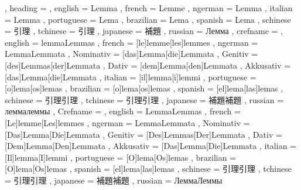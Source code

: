   {
    , heading   = {
                    , english     = Lemma
                    , french      = Lemme
                    , ngerman     = Lemma
                    , italian     = Lemma
                    , portuguese  = Lema
                    , brazilian   = Lema
                    , spanish     = Lema
                    , schinese    = 引理
                    , tchinese    = 引理
                    , japanese    = 補題
                    , russian     = Лемма
                  }
    , crefname  = {
                    , english     = {lemma}{Lemmas}
                    , french      = [le]{lemme}[les]{lemmes}
                    , ngerman     = { {Lemma}{Lemmata}
                                      , Nominativ = [das]{Lemma}[die]{Lemmata}
                                      , Genitiv   = [des]{Lemmas}[der]{Lemmata}
                                      , Dativ     = [dem]{Lemma}[den]{Lemmata}
                                      , Akkusativ = [das]{Lemma}[die]{Lemmata}
                                    }
                    , italian     = [il]{lemma}[i]{lemmi}
                    , portuguese  = [o]{lema}[os]{lemas}
                    , brazilian   = [o]{lema}[os]{lemas}
                    , spanish     = [el]{lema}[las]{lemas}
                    , schinese    = {引理}{引理}
                    , tchinese    = {引理}{引理}
                    , japanese    = {補題}{補題}
                    , russian     = {лемма}{леммы}
                  }
    , Crefname  = {
                    , english     = {Lemma}{Lemmas}
                    , french      = [Le]{lemme}[Les]{lemmes}
                    , ngerman     = { {Lemma}{Lemmata}
                                      , Nominativ = [Das]{Lemma}[Die]{Lemmata}
                                      , Genitiv   = [Des]{Lemmas}[Der]{Lemmata}
                                      , Dativ     = [Dem]{Lemma}[Den]{Lemmata}
                                      , Akkusativ = [Das]{Lemma}[Die]{Lemmata}
                                    }
                    , italian     = [Il]{lemma}[I]{lemmi}
                    , portuguese  = [O]{lema}[Os]{lemas}
                    , brazilian   = [O]{lema}[Os]{lemas}
                    , spanish     = [el]{lema}[las]{lemas}
                    , schinese    = {引理}{引理}
                    , tchinese    = {引理}{引理}
                    , japanese    = {補題}{補題}
                    , russian     = {Лемма}{Леммы}
                  }
  }

